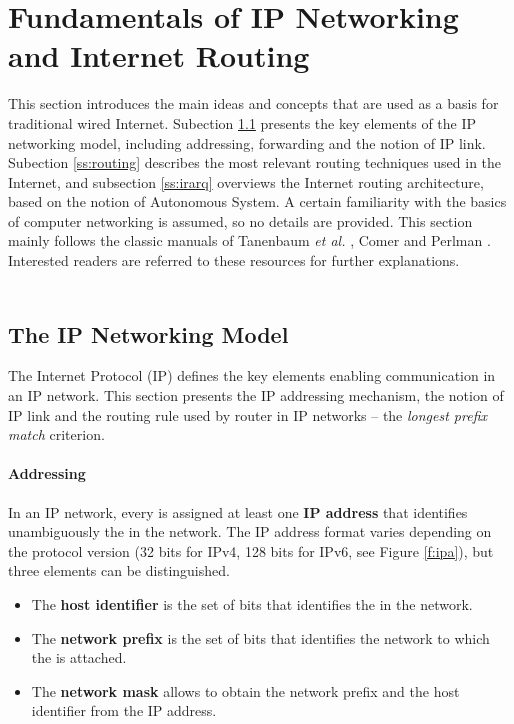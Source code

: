 \section{Fundamentals of IP Networking and Internet Routing}
\label{s:fundamentals}

This section introduces the main ideas and concepts that are used as a basis for traditional wired Internet. Subection \ref{ss:ip} presents the key elements of the IP networking model, including addressing, forwarding and the notion of IP link. Subection \ref{ss:routing} describes the most relevant routing techniques used in the Internet, and subsection \ref{ss:irarq} overviews the Internet routing architecture, based on the notion of Autonomous System. A certain familiarity with the basics of computer networking is assumed, so no details are provided. This section mainly follows the classic manuals of Tanenbaum {\em et al.} \cite{tanenbaum}, Comer \cite{comer} and Perlman \cite{interconnections}. Interested readers are referred to these resources for further explanations. \ \\ \ \\
%
%
\subsection{The IP Networking Model}
\label{ss:ip}
%
The Internet Protocol (IP) defines the key elements enabling communication in an IP network. This section presents the IP addressing mechanism, the notion of IP link and the routing rule used by router in IP networks -- the {\em longest prefix match} criterion.
%
\paragraph{Addressing}

In an IP network, every  is assigned at least one {\bf IP address} that identifies unambiguously the  in the network. The IP address format varies depending on the protocol version (32 bits for IPv4, 128 bits for IPv6, see Figure \ref{f:ipa}), but three elements  can be distinguished.

\begin{itemize}
\item The {\bf host identifier} is the set of bits that identifies the  in the network.
\item The {\bf network prefix} is the set of bits that identifies the network to which the  is attached.
\item The {\bf network mask} allows to obtain the network prefix and the host identifier from the IP address. 
\end{itemize}

